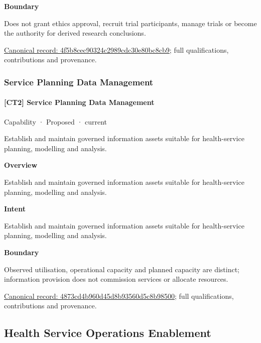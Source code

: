 \textbf{Boundary}



Does not grant ethics approval, recruit trial participants, manage trials or become the authority for derived research conclusions.


{\footnotesize \href{../../../../continuum/strategy/capability/4f5b8cec90324c2989cdc30e80bc8cb9.md}{Canonical record: 4f5b8cec90324c2989cdc30e80bc8cb9}; full qualifications, contributions and provenance.}\par
\subsubsection{Service Planning Data Management}

\paragraph{[CT2] Service Planning Data Management}

\label{element:4873cd4b960d45d8b93560d5c8b98500}
{\small Capability · Proposed · current}\par

Establish and maintain governed information assets suitable for health-service planning, modelling and analysis.



\textbf{Overview}



Establish and maintain governed information assets suitable for health-service planning, modelling and analysis.



\textbf{Intent}



Establish and maintain governed information assets suitable for health-service planning, modelling and analysis.



\textbf{Boundary}



Observed utilisation, operational capacity and planned capacity are distinct; information provision does not commission services or allocate resources.


{\footnotesize \href{../../../../continuum/strategy/capability/4873cd4b960d45d8b93560d5c8b98500.md}{Canonical record: 4873cd4b960d45d8b93560d5c8b98500}; full qualifications, contributions and provenance.}\par
\subsection{Health Service Operations Enablement}

